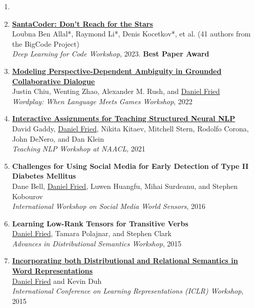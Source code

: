 \begin{enumerate}[leftmargin=-1mm,partopsep=0pt]
\item[]

\item \href{SantaCoder: Don't Reach for the Stars}{\textbf{SantaCoder: Don't Reach for the Stars}} \\
  Loubna Ben Allal*, Raymond Li*, Denis Kocetkov*, et al. (41 authors from the BigCode Project)\\
  \emph{Deep Learning for Code Workshop}, 2023. \textbf{Best Paper Award}

\item \href{https://openreview.net/pdf?id=PkHSHZLig5H}{\textbf{Modeling Perspective-Dependent Ambiguity in Grounded Collaborative Dialogue}} \\
  Justin Chiu, Wenting Zhao, Alexander M. Rush, and \underline{Daniel Fried}\\
  \emph{Wordplay: When Language Meets Games Workshop}, 2022

\item \href{http://nlp.cs.berkeley.edu/pubs/Gaddy-Fried-Kitaev-Stern-Corona-DeNero-Klein_2021_TeachingNLP_paper.pdf}{\textbf{Interactive Assignments for Teaching Structured Neural NLP}} \\
  David Gaddy, \underline{Daniel Fried}, Nikita Kitaev, Mitchell Stern, Rodolfo Corona, John DeNero, and Dan Klein\\
  \emph{Teaching NLP Workshop at NAACL}, 2021

\item \textbf{Challenges for Using Social Media for Early Detection of Type II Diabetes Mellitus} \\
  Dane Bell, \underline{Daniel Fried}, Luwen Huangfu, Mihai Surdeanu, and Stephen Kobourov\\
  \emph{International Workshop on Social Media World Sensors}, 2016

\item \textbf{Learning Low-Rank Tensors for Transitive Verbs} \\
  \underline{Daniel Fried}, Tamara Polajnar, and Stephen Clark\\
  \emph{Advances in Distributional Semantics Workshop}, 2015

\item \href{http://arxiv.org/abs/1412.5836}{\textbf{Incorporating both Distributional and Relational Semantics in Word Representations}} \\
  \underline{Daniel Fried} and Kevin Duh\\
  \emph{International Conference on Learning Representations (ICLR) Workshop}, 2015


\end{enumerate}
